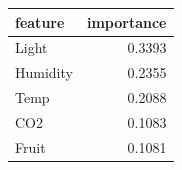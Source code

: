 \begin{tabular}{lr}
\toprule
feature & importance \\
\midrule
Light & 0.3393 \\
Humidity & 0.2355 \\
Temp & 0.2088 \\
CO2 & 0.1083 \\
Fruit & 0.1081 \\
\bottomrule
\end{tabular}
